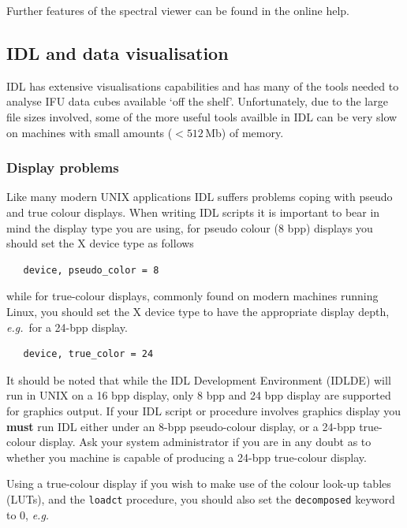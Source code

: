 \documentclass[twoside,11pt]{article}
\newcommand{\htmladdnormallink}[2]{#1}
\newcommand{\xlabel}[1]{}
\begin{document}
{Further features of the spectral viewer can be found in the online help.

\subsection{\xlabel{sc16_idl}IDL and data visualisation\label{sc16_idl}}

\htmladdnormallink{IDL}{http://www.rsinc.com/} has extensive
visualisations capabilities and has many of the tools needed to
analyse IFU data cubes available `off the shelf'.  Unfortunately, due
to the large file sizes involved, some of the more useful tools
availble in IDL can be very slow on machines with small amounts
($<512$\,Mb) of memory.

\subsubsection{Display problems}

Like many modern UNIX applications IDL suffers problems coping with
pseudo and true colour displays.  When writing IDL scripts it is
important to bear in mind the display type you are using, for pseudo
colour (8 bpp) displays you should set the X device type as follows

\small\begin{verbatim}
   device, pseudo_color = 8
\end{verbatim}\normalsize

while for true-colour displays, commonly found on modern machines
running Linux, you should set the X device type to have the
appropriate display depth, \emph{e.g.}\ for a 24-bpp display.

\small\begin{verbatim}
   device, true_color = 24
\end{verbatim}\normalsize

It should be noted that while the IDL Development Environment (IDLDE)
will run in UNIX on a 16 bpp display, only 8 bpp and 24 bpp display
are supported for graphics output.  If your IDL script or procedure
involves graphics display you {\bf must} run IDL either under an 8-bpp
pseudo-colour display, or a 24-bpp true-colour display.  Ask your
system administrator if you are in any doubt as to whether you machine
is capable of producing a 24-bpp true-colour display.

Using a true-colour display if you wish to make use of the colour
look-up tables (LUTs), and the {\tt loadct} procedure, you should also
set the {\tt decomposed} keyword to $0$, \emph{e.g.}\

}
\end{document}
